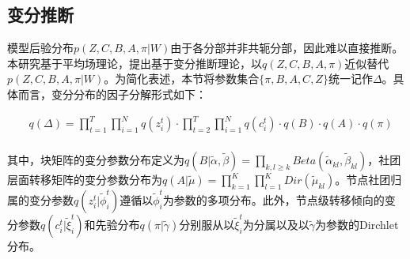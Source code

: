 \subsection{变分推断}

模型后验分布$p(Z, C, B, A, \pi | W)$由于各分部并非共轭分部，因此难以直接推断。本研究基于平均场理论，提出基于变分推断理论，以$q(Z, C, B, A, \pi)$近似替代$p(Z, C, B, A, \pi | W)$。为简化表述，本节将参数集合$\{\pi, B, A, C, Z\}$统一记作$\Delta$。具体而言，变分分布的因子分解形式如下：

\begin{equation}
\label{eq2}
\begin{split}
& q(\Delta) = \prod_{t=1}^T \prod_{i=1}^N q(z_i^t) \cdot \prod_{t=2}^T \prod_{i=1}^N q(c_i^t) \cdot q(B) \cdot q(A) \cdot q(\pi) \\
\end{split}
\end{equation}

其中，块矩阵的变分参数分布定义为$q(B | \widetilde{\alpha}, \widetilde{\beta}) = \prod_{k,l \geq k} Beta(\widetilde{\alpha}_{kl}, \widetilde{\beta}_{kl})$，社团层面转移矩阵的变分参数分布为$q(A | \widetilde{\mu}) = \prod_{k=1}^K \prod_{l=1}^K Dir(\widetilde{\mu}_{kl})$。节点社团归属的变分参数$q(z_i^t | \widetilde{\phi}_i^t)$遵循以$\widetilde{\phi}_i^t$为参数的多项分布。此外，节点级转移倾向的变分参数$q(c_i^t | \widetilde{\xi}_i^t)$和先验分布$q(\pi | \widetilde{\gamma})$分别服从以$\widetilde{\xi}_i^t$为分属以及以$\widetilde{\gamma}$为参数的Dirchlet分布。




